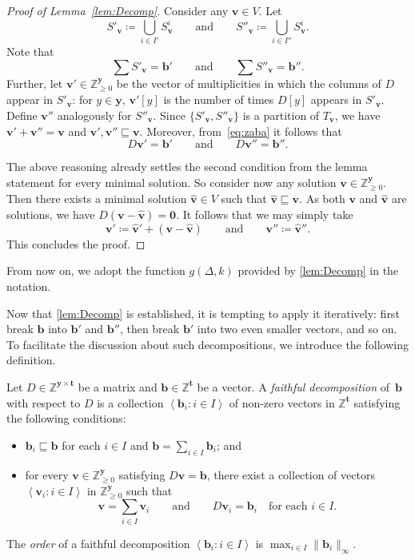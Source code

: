 \documentclass{article}
\renewcommand{\geq}{\geqslant}
\newcommand{\cfleq}{\sqsubseteq}
\newcommand{\Z}{\mathbb{Z}}
\newcommand{\Zn}{\Z_{\geq 0}}
\newcommand{\tup}[1]{{\mathbf{#1}}}
\newcommand{\yy}{\tup y}
\newcommand{\tv}{\tup t}
\newcommand{\bb}{\tup b}
\newcommand{\myvv}{\tup v} %
\newcommand{\matrices}[3]{#1^{#2\times #3}}
\newcommand{\mset}[1]{\left\langle #1\right\rangle}
\begin{document}
\begin{proof}[Proof of Lemma~\ref{lem:Decomp}]
Consider any $\myvv\in V$. Let
$$S'_\myvv\coloneqq \bigcup_{i\in I'} S^i_\myvv\qquad \textrm{and}\qquad S''_\myvv\coloneqq \bigcup_{i\in I''} S^i_\myvv .$$
Note that
\begin{equation}\label{eq:zaba}
\sum S'_\myvv = \bb'\qquad \textrm{and}\qquad \sum S''_\myvv = \bb''.
\end{equation}
Further, let $\myvv'\in \Zn^{\yy}$ be the vector of multiplicities in which the columns of $D$ appear in $S'_\myvv$: for $y\in \yy$, $\myvv'[y]$ is the number of times $D[y]$ appears in $S'_\myvv$. Define $\myvv''$ analogously for $S''_\myvv$. Since $\{S'_\myvv,S''_\myvv\}$ is a partition of $T_\myvv$, we have $\myvv'+\myvv''=\myvv$ and $\myvv',\myvv''\cfleq \myvv$. Moreover, from~\cref{eq:zaba} it follows that
\begin{equation*}
D\myvv' = \bb'\qquad \textrm{and}\qquad D\myvv'' = \bb''.
\end{equation*}

\newcommand{\whvv}{\widehat{\myvv}}

The above reasoning already settles the second condition from the lemma statement for every minimal solution. So consider now any solution $\myvv\in \Zn^\yy$. Then there exists a minimal solution $\whvv\in V$ such that $\whvv\cfleq \myvv$. As both $\myvv$ and $\whvv$ are solutions, we have $D(\myvv-\whvv)=\mathbf{0}$. It follows that we may simply take
$$\myvv'\coloneqq \whvv'+(\myvv-\whvv)\qquad \textrm{and}\qquad \myvv''\coloneqq \whvv''.$$
This concludes the proof.
\end{proof}

From now on, we adopt the function $g(\Delta,k)$ provided by \cref{lem:Decomp} in the notation.

Now that \cref{lem:Decomp} is established, it is tempting to apply it iteratively: first break $\bb$ into $\bb'$ and $\bb''$, then break $\bb'$ into two even smaller vectors, and so on. To facilitate the discussion about such decompositions, we introduce the following definition.

\begin{definition}
    Let $D\in \matrices{\Z}{\yy}{\tv}$ be a matrix and $\bb\in \Z^\tv$ be a vector. A {\em{faithful decomposition}} of~$\bb$ with respect to $D$ is a collection $\mset{\bb_i\colon i\in I}$ of non-zero vectors in $\Z^\tv$ satisfying the following conditions:
\begin{itemize}[nosep]
    \item $\bb_i\cfleq \bb$ for each $i\in I$ and $\bb=\sum_{i\in I} \bb_i$; and
    \item for every $\myvv\in \Zn^{\yy}$ satisfying $D\myvv=\bb$, there exist a collection of vectors $\mset{\myvv_i\colon i\in I}$ in $\Zn^{\yy}$ such that
    $$\myvv=\sum_{i\in I} \myvv_i\qquad \textrm{and} \qquad D\myvv_i=\bb_i\quad\textrm{for each }i\in I.$$
\end{itemize}
The {\em{order}} of a faithful decomposition $\mset{\bb_i\colon i\in I}$ is $\max_{i\in I} \|\bb_i\|_\infty$.
\end{definition}
\end{document}
